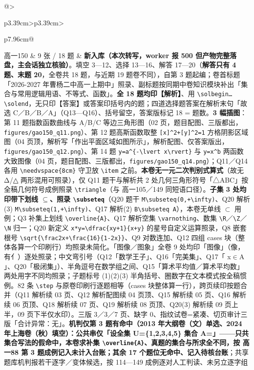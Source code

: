 \documentclass[a4paper,11pt]{article}
\begin{document}
\begin{xltabular}{\textwidth}{@{}>{\raggedright\arraybackslash}p{3.39cm}>{\centering\arraybackslash}p{3.39cm}>{\raggedright\arraybackslash}p{7.96cm}@{}}
高一150 & 9 张 / 18 题 & \textbf{新入库（本次转写，worker 报 500 但产物完整落盘，主会话独立核验）}。填空 3---12、选择 13---16、解答 17---20（\textbf{解答只有 4 题、末题 20}，全卷共 18 题，与近期 19 题卷不同），自第 3 题起编；卷首标题「2026-2027 年曹杨二中高一上期中」照录、副标题按同期中卷知识模块补出「集合与常用逻辑用语、不等式、函数」。\textbf{全 18 题均印【解析】}、用 \texttt{\textbackslash{}solbegin…\textbackslash{}solend}，无只印【答案】或答案印括号内的题；四道选择题答案在解析末句「故选 C／B／B／A」（Q13---Q16）、括号留空，答案版标记 18 = 题数。\textbf{3 幅插图}：第 11 题指数函数曲线与 A/B/C 等边三角形图（02 页，题目配图、三版都出，\texttt{figures/\allowbreak{}gao150\_q11.png}）、第 12 题高斯函数取整 \texttt{{[}x{]}\^{}2+{[}y{]}\^{}2=1} 方格阴影区域图（04 页顶，解析写「作出平面区域如图所示」，解析配图、仅答案版出，\texttt{figures/\allowbreak{}gao150\_q12.png}）、第 14 题 \texttt{y=a\^{}\{-\allowbreak{}\textbackslash{}lvert\ x\textbackslash{}rvert\}} 与 \texttt{y=x\^{}b} 两函数大致图像（04 页，题目配图、三版都出，\texttt{figures/\allowbreak{}gao150\_q14.png}）；Q11／Q14 各用 \texttt{\textbackslash{}needvspace\{8cm\}} 守卫放 \texttt{\textbackslash{}item} 之前。\textbf{本卷无一元二次判别式算式}（故无 Δ/△ 两形混用可照录），仅 Q11 题干与解析共 2 处几何三角形符号「△ABC」按全稿几何符号成例照录 \texttt{\textbackslash{}triangle}（与 高一105／149 同短语口径）。\textbf{子集 3 处均印带下划线 $\subseteq$、照录 \texttt{\textbackslash{}subseteq}}（Q20 题干 \texttt{M\textbackslash{}subseteq(0,+\textbackslash{}infty)}、Q20 解析(3) \texttt{M\textbackslash{}subseteq(1,+\textbackslash{}infty)}、Q17 解析(2) \texttt{B\textbackslash{}subseteq\ A}），本卷无单线 $\subset$ 用例；Q3 补集上划线 \texttt{\textbackslash{}overline\{A\}}、Q17 解析空集 \texttt{\textbackslash{}varnothing}、数集 \texttt{\textbackslash{}R}／\texttt{\textbackslash{}Z}／\texttt{\textbackslash{}N} 归一；Q20 新定义 \texttt{x*y=\textbackslash{}dfrac\{xy+1\}\{x+y\}} 的星号自定义运算照录，Q8 嵌套根号 \texttt{\textbackslash{}sqrt\{\textbackslash{}frac2x+\textbackslash{}frac\{16\}\{1-\allowbreak{}2x\}\}}、Q9 对数连加、Q12 四组 cases 块（整体各算一个印刷行）均照录未简化。「图像／图象」全卷 9 处均印「图像」（像，有亻）逐处照录；中文弯引号（Q12「数学王子」、Q16「完美集」、Q17「 x$\in$A 」、Q20「极闭集」）、半角逗号在数学组之间、Q15「算术平均值／算术平均数」两处用字不同均照录；子题标号 (1)(2)(3) 半角括号、圈数字在文本模式按全稿惯例。82 条 \texttt{\textbackslash{}step} 与原卷印刷行逐题相等（cases 块整体算一行），跨页续印按题合并（Q11 解析续 03 页、Q12 解析配图续 04 页顶、Q15 解析续 05 页、Q16 解析续 06 页顶、Q18 解析续 07 页、Q19 解析续 08 页顶、Q20(3) 解析续 09 页上半，09 页下半仅水印）。三版 3／3／7 页、缺字 0、指纹试卷=紧凑、切页审计三版「合计异常：无」。\textbf{机判仅第 3 题有命中（2013 年大纲卷（文）单选、2024 年上海卷（秋）填空）：公共串仅「设全集 U=\{1,2,3,4,5\} 集合 A=」------只共集合写法的假命中，本卷求补集 \texttt{\textbackslash{}overline\{A\}}、真题的集合与所求全不同，按 高一88 第 3 题成例记入未计入台账；其余 17 个题位无命中、记入待核台账}；共享题库机判报若干逐字／变体候选，按 114---149 成例逐对人工判读、未另立逐字组 \\ \addlinespace[1pt]

\end{xltabular}
\end{document}
